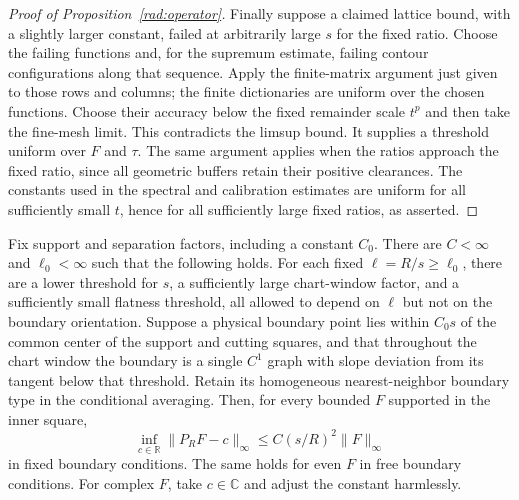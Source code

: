 \begin{proof}[Proof of Proposition~\ref{rad:operator}]
Finally suppose a claimed lattice bound, with a slightly larger
constant, failed at arbitrarily large $s$ for the fixed ratio.
Choose the failing functions and, for the supremum estimate,
failing contour configurations along that sequence.  Apply the
finite-matrix argument just given to those rows and columns;
the finite dictionaries are uniform over the chosen functions.
Choose their accuracy below the fixed remainder scale $t^p$ and
then take the fine-mesh limit.  This contradicts the limsup bound.
It supplies a threshold uniform over $F$ and $\tau$.  The same
argument applies when the ratios approach the fixed ratio,
since all geometric buffers retain their positive clearances.
The constants used in the spectral and calibration estimates are
uniform for all sufficiently small $t$, hence for all sufficiently
large fixed ratios, as asserted.
\end{proof}

\begin{samepage}
\begin{proposition}
\label{rad:boundary}
Fix support and separation factors, including a constant $C_0$.
There are $C<\infty$ and $\ell_0<\infty$ such that the following
holds.  For each fixed $\ell=R/s\geq\ell_0$, there are a lower
threshold for $s$, a sufficiently large chart-window factor, and
a sufficiently small flatness threshold, all allowed to depend
on $\ell$ but not on the boundary orientation.  Suppose a physical
boundary point lies within $C_0s$ of the common center of the
support and cutting squares, and that throughout the chart
window the boundary is a single $C^1$ graph with slope deviation
from its tangent below that threshold.  Retain its homogeneous
nearest-neighbor boundary type in the conditional averaging.
Then, for every bounded $F$ supported in the inner square,
\begin{equation}
               \inf_{c\in\mathbb R}\|P_RF-c\|_\infty
                       \leq C(s/R)^2\|F\|_\infty
 \label{eq:rad-boundary-operator}
\end{equation}
in fixed boundary conditions.  The same holds for even $F$ in
free boundary conditions.  For complex $F$, take $c\in\mathbb C$
and adjust the constant harmlessly.
\end{proposition}
\end{samepage}

